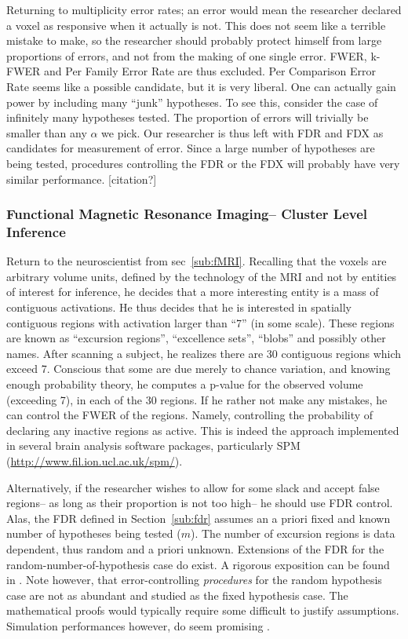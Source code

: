 \documentclass[review,12pt]{article}
\begin{document}
Returning to multiplicity error rates; an error would mean the researcher declared a voxel as responsive when it actually is not. This does not seem like a terrible mistake to make, so the researcher should probably protect himself from large proportions of errors, and not from the making of one single error. FWER, k-FWER and Per Family Error Rate are thus excluded. Per Comparison Error Rate seems like a possible candidate, but it is very liberal. One can actually gain power by including many ``junk'' hypotheses. To see this, consider the case of infinitely many hypotheses tested. The proportion of errors will trivially be smaller than any $\alpha$ we pick. Our researcher is thus left with FDR and FDX as candidates for measurement of error. Since a large number of hypotheses are being tested, procedures controlling the FDR or the FDX will probably have very similar performance. [citation?]


\subsubsection{Functional Magnetic Resonance Imaging-- Cluster Level Inference}

Return to the neuroscientist from sec~\ref{sub:fMRI}. Recalling that the voxels are arbitrary volume units, defined by the technology of the MRI and not by entities of interest for inference, he decides that a more interesting entity is a mass of contiguous activations. He thus decides that he is interested in spatially contiguous regions with activation larger than ``7'' (in some scale). These regions are known as ``excursion regions'', ``excellence sets'', ``blobs'' and possibly other names. 
After scanning a subject, he realizes there are 30 contiguous regions which exceed 7. Conscious that some are  due merely to chance variation, and knowing enough probability theory, he computes a p-value for the observed volume (exceeding 7), in each of the 30 regions. If he rather not make any mistakes, he can control the FWER of the regions. Namely, controlling the probability of declaring any inactive regions as active. This is indeed the approach implemented in several brain analysis software packages, particularly SPM (\url{http://www.fil.ion.ucl.ac.uk/spm/}).

Alternatively, if the researcher wishes to allow for some slack and accept false regions-- as long as their proportion is not too high-- he should use FDR control. Alas, the FDR defined in Section~\ref{sub:fdr} assumes an a priori fixed and known number of hypotheses being tested ($m$). The number of excursion regions is data dependent, thus random and a priori unknown. Extensions of the FDR for the random-number-of-hypothesis case do exist. A rigorous exposition can be found in  \citet{siegmund_false_2011}. Note however, that error-controlling \emph{procedures} for the random hypothesis case are not as abundant and studied as the fixed hypothesis case. The mathematical proofs would typically require some difficult to justify assumptions. Simulation performances however, do seem promising \citep{chumbley_false_2009,chumbley_topological_2010}.
\end{document}
